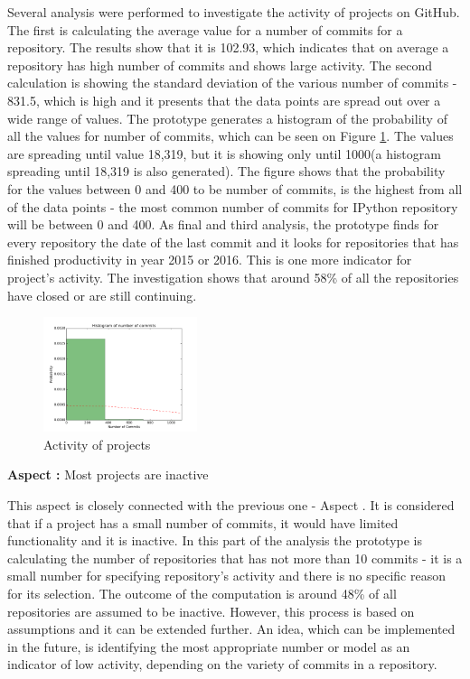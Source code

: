 Several analysis were performed to investigate the activity of projects on GitHub. The first is calculating the average value for a number of commits for a repository. The results show that it is 102.93, which indicates that on average a repository has high number of commits and shows large activity. The second calculation is showing the standard deviation\cite{stdWiki} of the various number of commits - 831.5, which is high and it presents that the data points are spread out over a wide range of values. The prototype generates a histogram of the probability of all the values for number of commits, which can be seen on Figure \ref{fig:histogram}. The values are spreading until value 18,319, but it is showing only until 1000(a histogram spreading until 18,319 is also generated). The figure shows that the probability for the values between 0 and 400 to be number of commits, is the highest from all of the data points - the most common number of commits for IPython repository will be between 0 and 400. As final and third analysis, the prototype finds for every repository the date of the last commit and it looks for repositories that has finished productivity in year 2015 or 2016. This is one more indicator for project's activity. The investigation shows that around 58\% of all the repositories have closed or are still continuing. 

\begin{figure}
\centering
\includegraphics[width=0.4\textwidth]{images/commits_histogram_zoomed.pdf}
\caption{Activity of projects}
\label{fig:histogram}
\end{figure}

\vspace{5mm}
\begin{mdframed}
\vspace{1px}
\textbf{Aspect :}  Most projects are inactive
\vspace{1px}
\end{mdframed}
\vspace{2mm}

This aspect is closely connected with the previous one - Aspect . It is considered that if a project has a small number of commits, it would have limited functionality and it is inactive. In this part of the analysis the prototype is calculating the number of repositories that has not more than 10 commits - it is a small number for specifying repository's activity and there is no specific reason for its selection. The outcome of the computation is around 48\% of all repositories are assumed to be inactive. However, this process is based on assumptions and it can be extended further. An idea, which can be implemented in the future, is identifying the most appropriate number or model as an indicator of low activity, depending on the variety of commits in a repository. 


